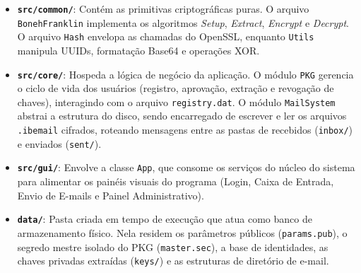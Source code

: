 \begin{itemize}
    \item \textbf{\texttt{src/common/}}: Contém as primitivas criptográficas puras. O arquivo \texttt{BonehFranklin} implementa os algoritmos \textit{Setup}, \textit{Extract}, \textit{Encrypt} e \textit{Decrypt}. O arquivo \texttt{Hash} envelopa as chamadas do OpenSSL, enquanto \texttt{Utils} manipula UUIDs, formatação Base64 e operações XOR.
    
    \item \textbf{\texttt{src/core/}}: Hospeda a lógica de negócio da aplicação. O módulo \texttt{PKG} gerencia o ciclo de vida dos usuários (registro, aprovação, extração e revogação de chaves), interagindo com o arquivo \texttt{registry.dat}. O módulo \texttt{MailSystem} abstrai a estrutura do disco, sendo encarregado de escrever e ler os arquivos \texttt{.ibemail} cifrados, roteando mensagens entre as pastas de recebidos (\texttt{inbox/}) e enviados (\texttt{sent/}).
    
    \item \textbf{\texttt{src/gui/}}: Envolve a classe \texttt{App}, que consome os serviços do núcleo do sistema para alimentar os painéis visuais do programa (Login, Caixa de Entrada, Envio de E-mails e Painel Administrativo). 
    
    \item \textbf{\texttt{data/}}: Pasta criada em tempo de execução que atua como banco de armazenamento físico. Nela residem os parâmetros públicos (\texttt{params.pub}), o segredo mestre isolado do PKG (\texttt{master.sec}), a base de identidades, as chaves privadas extraídas (\texttt{keys/}) e as estruturas de diretório de e-mail.
\end{itemize}
